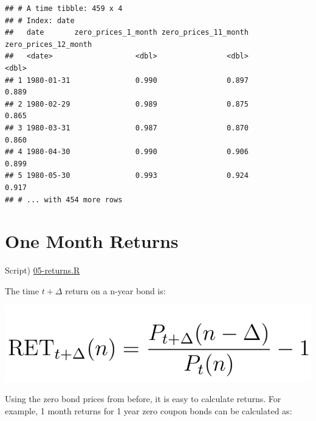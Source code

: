 \documentclass[]{book}
\newenvironment{Shaded}{\begin{snugshade}}{\end{snugshade}}
\newcommand{\DataTypeTok}[1]{\textcolor[rgb]{0.13,0.29,0.53}{#1}}
\newcommand{\DecValTok}[1]{\textcolor[rgb]{0.00,0.00,0.81}{#1}}
\newcommand{\KeywordTok}[1]{\textcolor[rgb]{0.13,0.29,0.53}{\textbf{#1}}}
\newcommand{\NormalTok}[1]{#1}
\newcommand{\OperatorTok}[1]{\textcolor[rgb]{0.81,0.36,0.00}{\textbf{#1}}}
\newcommand{\StringTok}[1]{\textcolor[rgb]{0.31,0.60,0.02}{#1}}
\theoremstyle{definition}
\theoremstyle{definition}
\theoremstyle{definition}
\theoremstyle{remark}
\begin{document}
\begin{verbatim}
## # A time tibble: 459 x 4
## # Index: date
##   date       zero_prices_1_month zero_prices_11_month zero_prices_12_month
##   <date>                   <dbl>                <dbl>                <dbl>
## 1 1980-01-31               0.990                0.897                0.889
## 2 1980-02-29               0.989                0.875                0.865
## 3 1980-03-31               0.987                0.870                0.860
## 4 1980-04-30               0.990                0.906                0.899
## 5 1980-05-30               0.993                0.924                0.917
## # ... with 454 more rows
\end{verbatim}

\hypertarget{one-month-returns}{%
\section{One Month Returns}\label{one-month-returns}}

Script) \href{./R/05-returns.R}{05-returns.R}

The time \(t+\Delta\) return on a n-year bond is:

\begin{center}\includegraphics[width=12.17in]{images/returns} \end{center}

Using the zero bond prices from before, it is easy to calculate returns.
For example, 1 month returns for 1 year zero coupon bonds can be
calculated as:

\begin{Shaded}
\end{Shaded}
\end{document}
